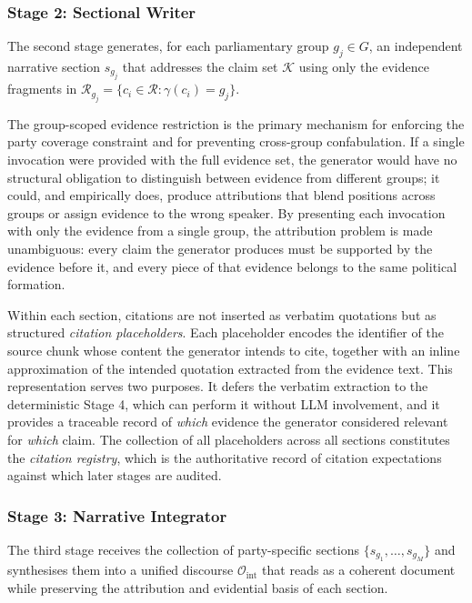 \subsubsection{Stage 2: Sectional Writer}

The second stage generates, for each parliamentary group $g_j \in G$, an independent
narrative section $s_{g_j}$ that addresses the claim set $\mathcal{K}$ using only the evidence
fragments in $\mathcal{R}_{g_j} = \{c_i \in \mathcal{R} : \gamma(c_i) = g_j\}$.

The group-scoped evidence restriction is the primary mechanism for enforcing the party coverage
constraint and for preventing cross-group confabulation. If a single invocation were provided
with the full evidence set, the generator would have no structural obligation to distinguish
between evidence from different groups; it could, and empirically does, produce attributions
that blend positions across groups or assign evidence to the wrong speaker. By presenting each
invocation with only the evidence from a single group, the attribution problem is made
unambiguous: every claim the generator produces must be supported by the evidence before it,
and every piece of that evidence belongs to the same political formation.

Within each section, citations are not inserted as verbatim quotations but as structured
\textit{citation placeholders}. Each placeholder encodes the identifier of the source chunk
whose content the generator intends to cite, together with an inline approximation of the
intended quotation extracted from the evidence text. This representation serves two purposes.
It defers the verbatim extraction to the deterministic Stage 4, which can perform it without
LLM involvement, and it provides a traceable record of \textit{which} evidence the generator
considered relevant for \textit{which} claim. The collection of all placeholders across all
sections constitutes the \textit{citation registry}, which is the authoritative record of
citation expectations against which later stages are audited.

\subsubsection{Stage 3: Narrative Integrator}

The third stage receives the collection of party-specific sections $\{s_{g_1}, \ldots,
s_{g_M}\}$ and synthesises them into a unified discourse $\mathcal{O}_\text{int}$ that
reads as a coherent document while preserving the attribution and evidential basis of each
section.

